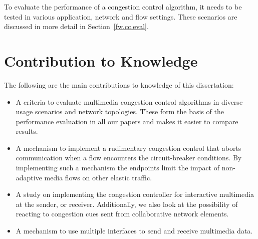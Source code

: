 To evaluate the performance of a congestion control algorithm, it needs to be
tested in various application, network and flow settings. These scenarios
are discussed in more detail in Section~\ref{fw.cc.eval}.

\section{Contribution to Knowledge}

The following are the main contributions to knowledge of this dissertation:

\begin{itemize}

\item A criteria to evaluate multimedia congestion control algorithms in
diverse usage scenarios and network topologies. These form the basis of the
performance evaluation in all our papers and makes it easier to compare
results.

\item A mechanism to implement a rudimentary congestion control that aborts
communication when a flow encounters the circuit-breaker conditions. By
implementing such a mechanism the endpoints limit the impact of non-adaptive
media flows on other elastic traffic.

\item A study on implementing the congestion controller for interactive
multimedia at the sender, or receiver.  Additionally, we also look at the
possibility of reacting to congestion cues sent from collaborative network
elements.

\item A mechanism to use multiple interfaces to send and receive multimedia
data.

\end{itemize}